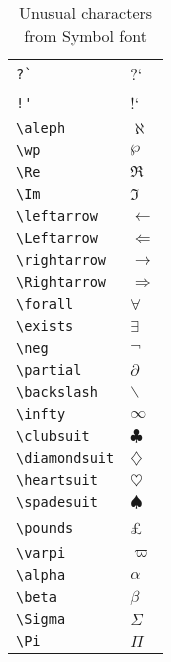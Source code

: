 \documentclass{article}
\begin{document}
\begin{table}
\begin{center}
\begin{tabular}{ll}
\verb#?`# & ?` \\
\verb#!'# & !` \\
\verb#\aleph# & $\aleph$\\
\verb#\wp# & $\wp$\\
\verb#\Re# & $\Re$\\
\verb#\Im# & $\Im$\\
\verb#\leftarrow# & $\leftarrow$\\
\verb#\Leftarrow# & $\Leftarrow$\\
\verb#\rightarrow# & $\rightarrow$\\
\verb#\Rightarrow# & $\Rightarrow$\\
\verb#\forall# & $\forall$\\
\verb#\exists# & $\exists$\\
\verb#\neg# & $\neg$\\
\verb#\partial# & $\partial$\\
\verb#\backslash# & $\backslash$\\
\verb#\infty# & $\infty$\\
\verb#\clubsuit# & $\clubsuit$\\
\verb#\diamondsuit# & $\diamondsuit$\\
\verb#\heartsuit# & $\heartsuit$\\
\verb#\spadesuit# & $\spadesuit$\\
\verb#\pounds# & \pounds\\
\verb#\varpi# & $\varpi$\\
\verb#\alpha# & $\alpha$\\
\verb#\beta# & $\beta$\\
\verb#\Sigma# & $\Sigma$\\
\verb#\Pi# & $\Pi$
\end{tabular}
\caption{Unusual characters from Symbol font}
\end{center}
\end{table}
\end{document}
